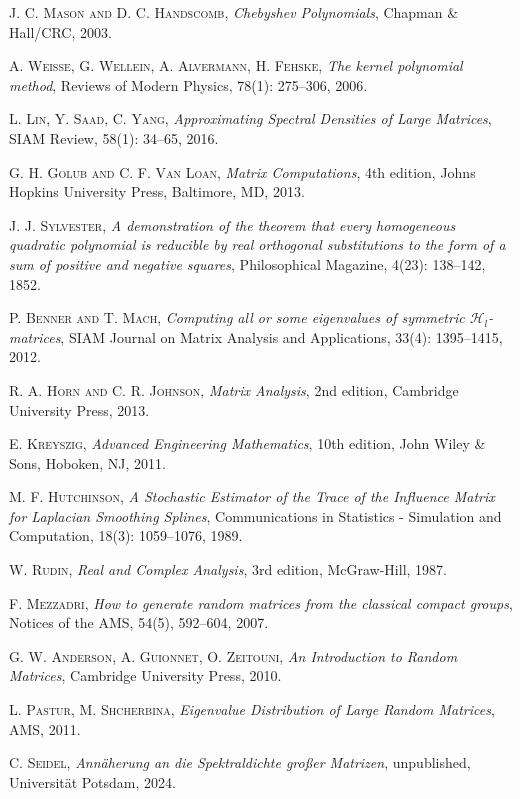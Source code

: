 \begin{thebibliography}{56}
    \textsc{J. C. Mason and D. C. Handscomb},
    \textit{Chebyshev Polynomials},
    Chapman \& Hall/CRC,
    2003.

    \textsc{A. Weisse, G. Wellein, A. Alvermann, H. Fehske},
    \textit{The kernel polynomial method},
    Reviews of Modern Physics, 78(1): 275--306,
    2006.

    \textsc{L. Lin, Y. Saad, C. Yang},
    \textit{Approximating Spectral Densities of Large Matrices},
    SIAM Review, 58(1): 34--65,
    2016.

    \textsc{G. H. Golub and C. F. Van Loan},
    \textit{Matrix Computations},
    4th edition,
    Johns Hopkins University Press,
    Baltimore, MD,
    2013.

    \textsc{J. J. Sylvester},
    \textit{A demonstration of the theorem that every homogeneous quadratic polynomial is reducible by real orthogonal substitutions to the form of a sum of positive and negative squares},
    Philosophical Magazine, 4(23): 138--142,
    1852.

    \textsc{P. Benner and T. Mach},
    \textit{Computing all or some eigenvalues of symmetric \textnormal{$\mathcal{H}_l$}-matrices},
    SIAM Journal on Matrix Analysis and Applications, 33(4): 1395--1415,
    2012.

    \textsc{R. A. Horn and C. R. Johnson},
    \textit{Matrix Analysis},
    2nd edition,
    Cambridge University Press,
    2013.

    \textsc{E. Kreyszig},
    \textit{Advanced Engineering Mathematics},
    10th edition,
    John Wiley \& Sons,
    Hoboken, NJ,
    2011.

    \textsc{M. F. Hutchinson},
    \textit{A Stochastic Estimator of the Trace of the Influence Matrix for Laplacian Smoothing Splines},
    Communications in Statistics - Simulation and Computation, 18(3): 1059--1076,
    1989.

    \textsc{W. Rudin},
    \textit{Real and Complex Analysis},
    3rd edition,
    McGraw-Hill,
    1987.

    \textsc{F. Mezzadri},
    \textit{How to generate random matrices from the classical compact groups},
    Notices of the AMS, 54(5), 592--604,
    2007.

    \textsc{G. W. Anderson, A. Guionnet, O. Zeitouni},
    \textit{An Introduction to Random Matrices},
    Cambridge University Press,
    2010.

    \textsc{L. Pastur, M. Shcherbina},
    \textit{Eigenvalue Distribution of Large Random Matrices},
    AMS,
    2011.

    \textsc{C. Seidel},
    \textit{Annäherung an die Spektraldichte großer Matrizen},
    unpublished, Universität Potsdam, 2024.

\end{thebibliography}